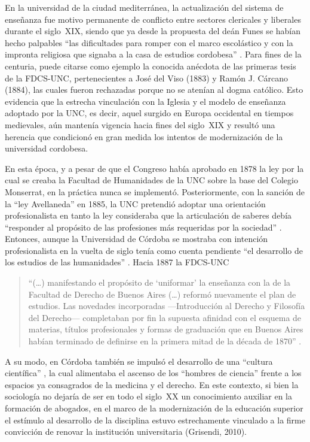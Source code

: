 En la universidad de la ciudad mediterránea, la actualización del sistema de enseñanza fue motivo permanente de conflicto entre sectores clericales y liberales durante el siglo~XIX, siendo que ya desde la propuesta del deán Funes se habían hecho palpables \enquote{las dificultades para romper con el marco escolástico y con la impronta religiosa que signaba a la casa de estudios cordobesa} \parencite[21]{1536-BUCHBINDER2010}. Para fines de la centuria, puede citarse como ejemplo la conocida anécdota de las primeras tesis de la FDCS-UNC, pertenecientes a José del Viso (1883) y Ramón J. Cárcano (1884), las cuales fueron rechazadas porque no se atenían al dogma católico. Esto evidencia que la estrecha vinculación con la Iglesia y el modelo de enseñanza adoptado por la UNC, es decir, aquel surgido en Europa occidental en tiempos medievales, aún mantenía vigencia hacia fines del siglo~XIX y resultó una herencia que condicionó en gran medida los intentos de modernización de la universidad cordobesa.

En esta época, y a pesar de que el Congreso había aprobado en 1878 la ley por la cual se creaba la Facultad de Humanidades de la UNC sobre la base del Colegio Monserrat, en la práctica nunca se implementó. Posteriormente, con la sanción de la \enquote{ley Avellaneda} en 1885, la UNC pretendió adoptar una orientación profesionalista en tanto la ley consideraba que la articulación de saberes debía \enquote{responder al propósito de las profesiones más requeridas por la sociedad} \parencite[26]{1561-CHAVES2013}. Entonces, aunque la Universidad de Córdoba se mostraba con intención profesionalista en la vuelta de siglo tenía como cuenta pendiente \enquote{el desarrollo de los estudios de las humanidades} \parencite[28]{1561-CHAVES2013}. Hacia 1887 la FDCS-UNC

\begin{quote}
\enquote{(\dots) manifestando el propósito de \enquote{uniformar} la enseñanza con la de la Facultad de Derecho de Buenos Aires (\dots) reformó nuevamente el plan de estudios. Las novedades incorporadas ---Introducción al Derecho y Filosofía del Derecho--- completaban por fin la supuesta afinidad con el esquema de materias, títulos profesionales y formas de graduación que en Buenos Aires habían terminado de definirse en la primera mitad de la década de 1870} \parencite[49]{1560-CHAVES2013}.
\end{quote}

A su modo, en Córdoba también se impulsó el desarrollo de una \enquote{cultura científica} \parencite{1506-TERAN2008}, la cual alimentaba el ascenso de los \enquote{hombres de ciencia} frente a los espacios ya consagrados de la medicina y el derecho. En este contexto, si bien la sociología no dejaría de ser en todo el siglo~XX un conocimiento auxiliar en la formación de abogados, en el marco de la modernización de la educación superior el estímulo al desarrollo de la disciplina estuvo estrechamente vinculado a la firme convicción de renovar la institución universitaria (Grisendi, 2010).

